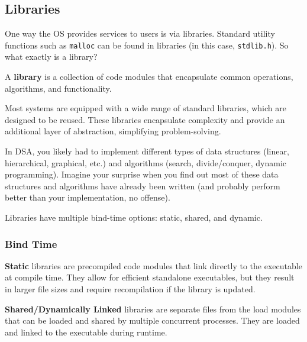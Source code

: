 \documentclass{article}
\begin{document}
\subsection{Libraries}
One way the OS provides services to users is via libraries. Standard utility functions such as
\texttt{malloc} can be found in libraries (in this case, \texttt{stdlib.h}). So what exactly is a
library?

\begin{tcolorbox}[title=Definition: Library]
  A \textbf{library} is a collection of code modules that encapsulate common operations, algorithms,
  and functionality. 
\end{tcolorbox}

Most systems are equipped with a wide range of standard libraries, which are designed to be
reused. These libraries encapsulate complexity and provide an additional layer of abstraction,
simplifying problem-solving. 

\begin{tcolorbox}[colback=blue!5!white,colframe=black!75!blue,title=Example: DSA Doozy] 
  In DSA, you likely had to implement different types of data structures (linear, hierarchical,
  graphical, etc.) and algorithms (search, divide/conquer, dynamic programming). Imagine your
  surprise when you find out most of these data structures and algorithms have already been written
  (and probably perform better than your implementation, no offense).
\end{tcolorbox}

Libraries have multiple bind-time options: static, shared, and dynamic.

\subsubsection{Bind Time}

\begin{tcolorbox}[title=Definition: Static]
  \textbf{Static} libraries are precompiled code modules that link directly to the executable at
  compile time. They allow for efficient standalone executables, but they result in larger file
  sizes and require recompilation if the library is updated.  
\end{tcolorbox}

\begin{tcolorbox}[title=Definition: Shared]
  \textbf{Shared/Dynamically Linked} libraries are separate files from the load modules that can
  be loaded and shared by multiple concurrent processes. They are loaded and linked to the
  executable during runtime. 
\end{tcolorbox}
\end{document}
